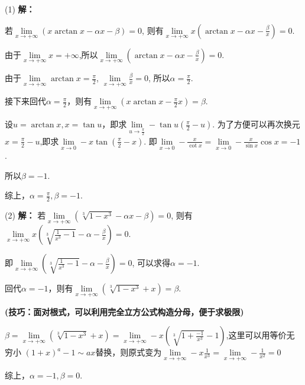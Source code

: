 \documentclass[12pt , a4paper , oneside]{ctexart}
\begin{document}
            \begin{mdframed}
            (1) \textbf{解：}

            若$\lim\limits_{x \to +\infty} (x\arctan x - \alpha x - \beta) = 0$,
            则有$\lim\limits_{x \to +\infty} x(\arctan x - \alpha x - \frac{\beta}{x}) = 0$.

            由于$\lim\limits_{x \to +\infty} x = +\infty$,所以$\lim\limits_{x \to +\infty} (\arctan x - \alpha x - \frac{\beta}{x}) = 0$.

            由于$\lim\limits_{x \to +\infty} \arctan x = \frac{\pi}{2}$,
            $\lim\limits_{x \to +\infty} \frac{\beta}{x} = 0$,
            所以$\alpha = \frac{\pi}{2}$.

            接下来回代$\alpha = \frac{\pi}{2}$，则有$\lim\limits_{x \to +\infty} (x\arctan x - \frac{\pi}{2} x)=\beta$.

            设$u=\arctan x,x = \tan u$，即求$\lim\limits_{u \to \frac{\pi}{2}} - \tan u(\frac{\pi}{2} - u)$.
            为了方便可以再次换元$x = \frac{\pi}{2} - u$,即求$\lim\limits_{x \to 0} - x \tan(\frac{\pi}{2} - x)$.
            即$\lim\limits_{x \to 0} - \frac{x}{\cot x} = \lim\limits_{x \to 0} - \frac{x}{\sin x}\cos x = -1$.

            所以$\beta = -1$.
            
            综上，$\alpha = \frac{\pi}{2},\beta = -1$.
            \end{mdframed}
            
            \begin{mdframed}
            (2) \textbf{解：}
            若$\lim\limits_{x \to +\infty} (\sqrt[3]{1-x^{3}}-\alpha x - \beta) = 0$,
            则有$\lim\limits_{x \to +\infty} x (\sqrt[3]{ \frac{1}{x^3} - 1}-\alpha- \frac{\beta}{x}) = 0$.

            即$\lim\limits_{x \to +\infty} (\sqrt[3]{ \frac{1}{x^3} - 1}-\alpha- \frac{\beta}{x}) = 0$,
            可以求得$\alpha = -1$. 
            
            回代$\alpha = -1$，则有$\lim\limits_{x \to +\infty} (\sqrt[3]{1-x^{3}}+x)=\beta$.

            \textbf{\fangsong (技巧：面对根式，可以利用完全立方公式构造分母，便于求极限)}

            $\beta = \lim\limits_{x \to +\infty} (\sqrt[3]{1-x^{3}}+x) =
            \lim\limits_{x \to +\infty} -x (\sqrt[3]{ 1 + \frac{-1}{x^3} }-1)$,这里可以用等价无穷小
            $(1+x)^a -1 \sim ax$替换，则原式变为$\lim\limits_{x \to +\infty} -x\frac{1}{x^3} = 
            \lim\limits_{x \to +\infty} -\frac{1}{x^2} = 0$
            
            综上，$\alpha = -1,\beta = 0$.
            \end{mdframed}
\end{document}
